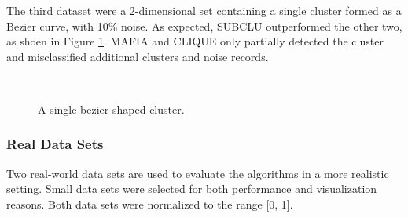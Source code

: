 The third dataset were a 2-dimensional set containing a single cluster formed as a Bezier curve, with 10\% noise. As expected, SUBCLU outperformed the other two, as shoen in Figure \ref{fig:accuracy_bezier}. MAFIA and CLIQUE only partially detected the cluster and misclassified additional clusters and noise records.
\begin{figure}[H]
    \vspace*{-0.6cm}
    \hspace*{-0.6cm}
    \centering
    ~~
    ~~
    \caption{A single bezier-shaped cluster.}
    \label{fig:accuracy_bezier}
\end{figure}

\subsubsection{Real Data Sets}
Two real-world data sets are used to evaluate the algorithms in a more realistic setting. Small data sets were selected for both performance and visualization reasons. Both data sets were normalized to the range [0, 1].

